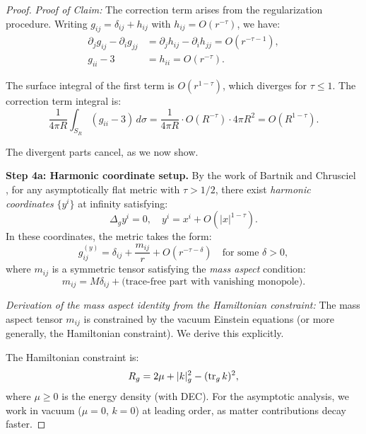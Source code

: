 \begin{proof}
\textit{Proof of Claim:} The correction term arises from the regularization procedure. Writing $g_{ij} = \delta_{ij} + h_{ij}$ with $h_{ij} = O(r^{-\tau})$, we have:
\begin{align}
    \partial_j g_{ij} - \partial_i g_{jj} &= \partial_j h_{ij} - \partial_i h_{jj} = O(r^{-\tau - 1}), \\
    g_{ii} - 3 &= h_{ii} = O(r^{-\tau}).
\end{align}

The surface integral of the first term is $O(r^{1-\tau})$, which diverges for $\tau \le 1$. The correction term integral is:
\begin{equation}
    \frac{1}{4\pi R} \int_{S_R} (g_{ii} - 3) \, d\sigma = \frac{1}{4\pi R} \cdot O(R^{-\tau}) \cdot 4\pi R^2 = O(R^{1-\tau}).
\end{equation}

The divergent parts cancel, as we now show.

\textbf{Step 4a: Harmonic coordinate setup.}
By the work of Bartnik \cite{bartnik1986} and Chrusciel \cite{chrusciel1986}, for any asymptotically flat metric with $\tau > 1/2$, there exist \emph{harmonic coordinates} $\{y^i\}$ at infinity satisfying:
\begin{equation}
    \Delta_g y^i = 0, \quad y^i = x^i + O(|x|^{1-\tau}).
\end{equation}
In these coordinates, the metric takes the form:
\begin{equation}
    g_{ij}^{(y)} = \delta_{ij} + \frac{m_{ij}}{r} + O(r^{-\tau - \delta}) \quad \text{for some } \delta > 0,
\end{equation}
where $m_{ij}$ is a symmetric tensor satisfying the \emph{mass aspect} condition:
\begin{equation}
    m_{ij} = M \delta_{ij} + \text{(trace-free part with vanishing monopole)}.
\end{equation}

\textit{Derivation of the mass aspect identity from the Hamiltonian constraint:}
The mass aspect tensor $m_{ij}$ is constrained by the vacuum Einstein equations (or more generally, the Hamiltonian constraint). We derive this explicitly.

The Hamiltonian constraint is:
\begin{equation}
    R_g = 2\mu + |k|_g^2 - (\operatorname{tr}_g k)^2,
\end{equation}
where $\mu \ge 0$ is the energy density (with DEC). For the asymptotic analysis, we work in vacuum ($\mu = 0$, $k = 0$) at leading order, as matter contributions decay faster.


\end{proof}
